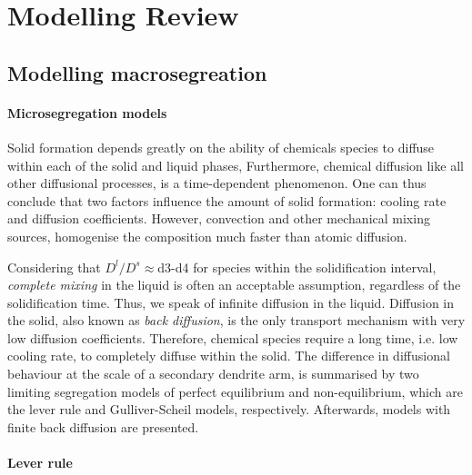 \chapter{Modelling Review}
\begin{nolinkcolors} 
\minitoc
\end{nolinkcolors}
\newpage

\section{Modelling macrosegreation}
%
\subsubsection{Microsegregation models}
Solid formation depends greatly on the ability of chemicals species to diffuse within each of 
the solid and liquid phases, %
Furthermore, chemical diffusion like all other 
diffusional processes, is a time-dependent phenomenon. One can thus conclude that two factors
influence the amount of solid formation: cooling rate and diffusion coefficients. However, 
convection and other mechanical mixing sources, homogenise the composition much faster than atomic diffusion. 

Considering that $D^l/D^s\approx$\num{d3}-\num{d4} for species within the solidification interval, \emph{complete mixing} in the liquid is often an acceptable assumption, regardless of the 
solidification time. Thus, we speak of infinite diffusion in the liquid. Diffusion in the solid, 
also known as \emph{back diffusion}, is the only transport mechanism with very low diffusion coefficients. 
Therefore, chemical species require a long time, i.e. low cooling rate, to completely diffuse within the solid.
The difference in diffusional behaviour at the scale of a secondary dendrite arm, is summarised by two limiting 
segregation models of perfect equilibrium  and non-equilibrium, which are the lever rule and Gulliver-Scheil models, respectively. 
Afterwards, models with finite back diffusion are presented. 

\subsubsection*{Lever rule}

